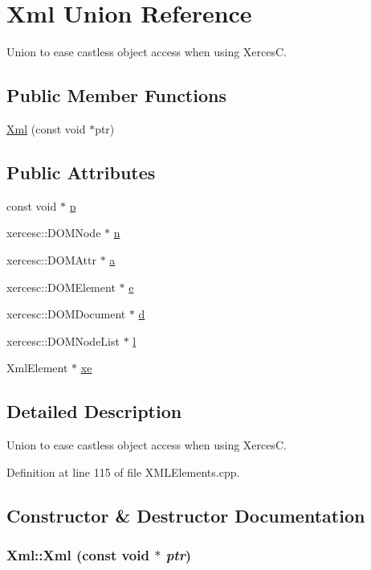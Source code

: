 \hypertarget{union_xml}{
\section{Xml Union Reference}
\label{union_xml}
}


Union to ease castless object access when using XercesC.  
\subsection*{Public Member Functions}
\begin{DoxyCompactItemize}
\item 
\hyperlink{union_xml_a96480dcc1523d3be6c9b93187f336ac0}{Xml} (const void $\ast$ptr)
\end{DoxyCompactItemize}
\subsection*{Public Attributes}
\begin{DoxyCompactItemize}
\item 
const void $\ast$ \hyperlink{union_xml_a1049a06460eb8ee2878b7ced0fdb19e8}{p}
\item 
xercesc::DOMNode $\ast$ \hyperlink{union_xml_a6b78aa150fc8fa96aa1ce57c01a5268d}{n}
\item 
xercesc::DOMAttr $\ast$ \hyperlink{union_xml_a5a994b5f4b681d2f041c7c1261565c4e}{a}
\item 
xercesc::DOMElement $\ast$ \hyperlink{union_xml_a6d7cc65c82929e86d2f8e2b300a10624}{e}
\item 
xercesc::DOMDocument $\ast$ \hyperlink{union_xml_a3f663e54c774ae9eb843e0c8b0abd337}{d}
\item 
xercesc::DOMNodeList $\ast$ \hyperlink{union_xml_ac527c7a9b99fd1748b7a33e401b7f003}{l}
\item 
XmlElement $\ast$ \hyperlink{union_xml_abd997a186caa27d85c309989aceb690f}{xe}
\end{DoxyCompactItemize}


\subsection{Detailed Description}
Union to ease castless object access when using XercesC. 

Definition at line 115 of file XMLElements.cpp.

\subsection{Constructor \& Destructor Documentation}
\hypertarget{union_xml_a96480dcc1523d3be6c9b93187f336ac0}{
\subsubsection[{Xml}]{\setlength{\rightskip}{0pt plus 5cm}Xml::Xml (const void $\ast$ {\em ptr})}}
\label{union_xml_a96480dcc1523d3be6c9b93187f336ac0}


